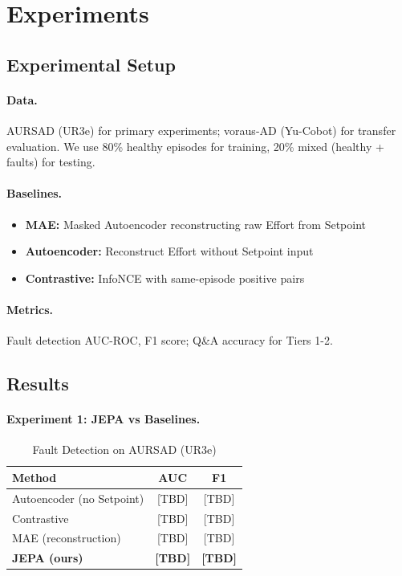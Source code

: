 \documentclass{article}
\begin{document}
\section{Experiments}

\subsection{Experimental Setup}

\paragraph{Data.} AURSAD (UR3e) for primary experiments; voraus-AD (Yu-Cobot) for transfer evaluation. We use 80\% healthy episodes for training, 20\% mixed (healthy + faults) for testing.

\paragraph{Baselines.}
\begin{itemize}
    \item \textbf{MAE:} Masked Autoencoder reconstructing raw Effort from Setpoint
    \item \textbf{Autoencoder:} Reconstruct Effort without Setpoint input
    \item \textbf{Contrastive:} InfoNCE with same-episode positive pairs
\end{itemize}

\paragraph{Metrics.} Fault detection AUC-ROC, F1 score; Q\&A accuracy for Tiers 1-2.

\subsection{Results}

\paragraph{Experiment 1: JEPA vs Baselines.}

\begin{table}[h]
\centering
\caption{Fault Detection on AURSAD (UR3e)}
\begin{tabular}{lcc}
\toprule
\textbf{Method} & \textbf{AUC} & \textbf{F1} \\
\midrule
Autoencoder (no Setpoint) & [TBD] & [TBD] \\
Contrastive & [TBD] & [TBD] \\
MAE (reconstruction) & [TBD] & [TBD] \\
\textbf{JEPA (ours)} & \textbf{[TBD]} & \textbf{[TBD]} \\
\bottomrule
\end{tabular}
\end{table}
\end{document}
